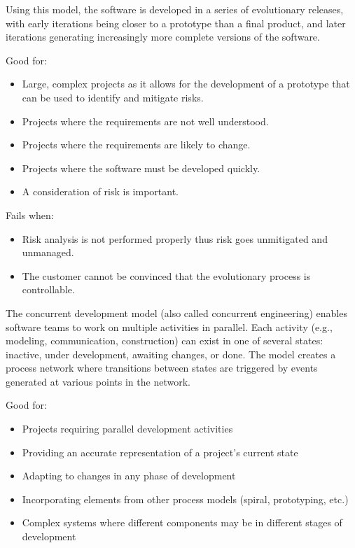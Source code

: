 \documentclass[12pt letter]{report}
\begin{document}

Using this model, the software is developed in a series of evolutionary releases, with early iterations being closer to a prototype than a final product, and later iterations generating increasingly more complete versions of the software.

Good for:
\begin{itemize}
  \item Large, complex projects as it allows for the development of a prototype that can be used to identify and mitigate risks.
  \item Projects where the requirements are not well understood.
  \item Projects where the requirements are likely to change.
  \item Projects where the software must be developed quickly.
  \item A consideration of risk is important.
\end{itemize}

Fails when:
\begin{itemize}
  \item Risk analysis is not performed properly thus risk goes unmitigated and unmanaged.
  \item The customer cannot be convinced that the evolutionary process is controllable.
\end{itemize}

The concurrent development model (also called concurrent engineering) enables software teams to work on multiple activities in parallel. Each activity (e.g., modeling, communication, construction) can exist in one of several states: inactive, under development, awaiting changes, or done. The model creates a process network where transitions between states are triggered by events generated at various points in the network.


Good for:
\begin{itemize}
  \item Projects requiring parallel development activities
  \item Providing an accurate representation of a project's current state
  \item Adapting to changes in any phase of development
  \item Incorporating elements from other process models (spiral, prototyping, etc.)
  \item Complex systems where different components may be in different stages of development
\end{itemize}
\end{document}
